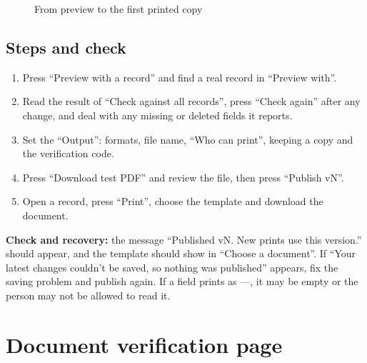 \begin{figure}[H]
\centering
{}
\rclegend
\caption{From preview to the first printed copy}
\label{fig:builder-print-publish-flow}
\end{figure}

\subsection{Steps and check}
\begin{enumerate}
\item Press “Preview with a record” and find a real record in “Preview with”.
\item Read the result of “Check against all records”, press “Check again” after any change, and deal with any missing or deleted fields it reports.
\item Set the “Output”: formats, file name, “Who can print”, keeping a copy and the verification code.
\item Press “Download test PDF” and review the file, then press “Publish vN”.
\item Open a record, press “Print”, choose the template and download the document.
\end{enumerate}

\textbf{Check and recovery:} the message “Published vN. New prints use this version.” should appear, and the template should show in “Choose a document”. If “Your latest changes couldn’t be saved, so nothing was published” appears, fix the saving problem and publish again. If a field prints as —, it may be empty or the person may not be allowed to read it.

\clearpage
\section{Document verification page}
\label{sec:builder-feature-print-verify}

